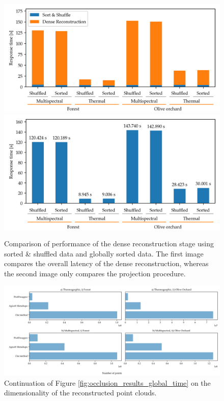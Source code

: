 \begin{figure}
\includegraphics[width=\linewidth]{figs/multi_thermal_projection/results/stacked_stage_response_time.png}
\includegraphics[width=\linewidth]{figs/multi_thermal_projection/results/shuffled_response_time.png}
\caption{Comparison of performance of the dense reconstruction stage using sorted \& shuffled data and globally sorted data. The first image compares the overall latency of the dense reconstruction, whereas the second image only compares the projection procedure.}
\label{fig:shuffle_comparison}
\end{figure}

\begin{figure}
    \ContinuedFloat
    \centering
    \includegraphics[width=\linewidth]{figs/multi_thermal_projection/results/point_cloud_size.png}
    \caption{Continuation of Figure \ref{fig:occlusion_results_global_time} on the dimensionality of the reconstructed point clouds. }
    \label{fig:occlusion_point_cloud_size}
\end{figure}

